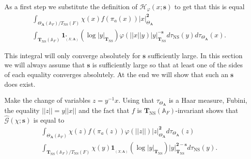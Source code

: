 \documentclass[a4paper,11pt,reqno]{amsart}
\newcommand{\A}{\mathbb{A}}
\DeclareMathOperator{\NS}{NS}
\DeclareMathOperator{\Eff}{\overline{Eff}}
\theoremstyle{definition}
\begin{document}
As a first step we substitute the definition of $\mathcal{H}_{\varphi}(x; \bm{s})$ to get that this is equal
\begin{equation*}
	\begin{split}
		&\int_{\Theta_{\mathbf{A}}(\A_F)/T_{\NS}(F)} \chi(x) f(\pi_a(x))|x|_{\Theta_{\mathbf{A}}}^{\mathbf{2}} \\
		&\int_{\mathbf{T}_{\NS}(\A_F)} \mathbf{1}_{\Eff_{(X; \mathbf{A})}^*}(\log |y|_{\mathbf{T}_{\NS}}) \varphi(||x|| y) |y|_{\mathbf{T}_{\NS}}^{-\bm{s}} d \tau_{\NS}(y) d\tau_{\Theta_{\mathbf{A}}}(x).
	\end{split}
\end{equation*}

This integral will only converge absolutely for $\bm{s}$ sufficiently large. In this section we will always assume that $\bm{s}$ is sufficiently large so that at least one of the sides of each equality converges absolutely. At the end we will show that such an $\bm{s}$ does exist.

Make the change of variables $z = y^{-1} x$. Using that $\tau_{\Theta_{\mathbf{A}}}$ is a Haar measure, Fubini, the equality $||z|| = y ||x||$ and the fact that $f$ is $\mathbf{T}_{\NS}(\A_F)$-invariant shows that $\hat{\mathcal{G}}(\chi ; \bm{s})$ is equal to
\begin{equation}\label{eq:Decomposition into two integrals}
	\begin{split}
		&\int_{\Theta_{\mathbf{A}}(\A_F)} \chi(z) f(\pi_a(z)) \varphi(||z||)|z|_{\Theta_{\mathbf{A}}}^{\mathbf{2}} d\tau_{\Theta_{\mathbf{A}}}(z) \\ &\int_{\mathbf{T}_{\NS}(\A_F)/T_{\NS}(F)} \chi(y) \mathbf {1}_{\Eff_{(X; \mathbf{A})}}(\log |y|_{\mathbf{T}_{\NS}}) |y|_{\mathbf{T}_{\NS}}^{\mathbf{2} - \bm{s}} d \tau_{\NS}(y).
	\end{split}
\end{equation}
\end{document}
